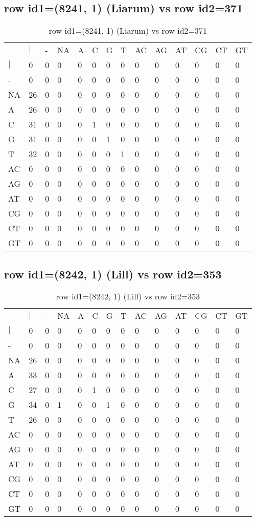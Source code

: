 \subsection{row id1=(8241, 1) (Liarum) vs row id2=371}
\begin{center}
\begin{longtable}{|l|l|l|l|l|l|l|l|l|l|l|l|l|l|}
\caption{row id1=(8241, 1) (Liarum) vs row id2=371} \label{table_dm372}\\
\hline
\\
\hline
&$|$&-&NA&A&C&G&T&AC&AG&AT&CG&CT&GT\\
$|$&0&0&0&0&0&0&0&0&0&0&0&0&0\\
-&0&0&0&0&0&0&0&0&0&0&0&0&0\\
NA&26&0&0&0&0&0&0&0&0&0&0&0&0\\
A&26&0&0&0&0&0&0&0&0&0&0&0&0\\
C&31&0&0&0&1&0&0&0&0&0&0&0&0\\
G&31&0&0&0&0&1&0&0&0&0&0&0&0\\
T&32&0&0&0&0&0&1&0&0&0&0&0&0\\
AC&0&0&0&0&0&0&0&0&0&0&0&0&0\\
AG&0&0&0&0&0&0&0&0&0&0&0&0&0\\
AT&0&0&0&0&0&0&0&0&0&0&0&0&0\\
CG&0&0&0&0&0&0&0&0&0&0&0&0&0\\
CT&0&0&0&0&0&0&0&0&0&0&0&0&0\\
GT&0&0&0&0&0&0&0&0&0&0&0&0&0\\
\hline
\end{longtable}
\end{center}

\subsection{row id1=(8242, 1) (Lill) vs row id2=353}
\begin{center}
\begin{longtable}{|l|l|l|l|l|l|l|l|l|l|l|l|l|l|}
\caption{row id1=(8242, 1) (Lill) vs row id2=353} \label{table_dm374}\\
\hline
\\
\hline
&$|$&-&NA&A&C&G&T&AC&AG&AT&CG&CT&GT\\
$|$&0&0&0&0&0&0&0&0&0&0&0&0&0\\
-&0&0&0&0&0&0&0&0&0&0&0&0&0\\
NA&26&0&0&0&0&0&0&0&0&0&0&0&0\\
A&33&0&0&0&0&0&0&0&0&0&0&0&0\\
C&27&0&0&0&1&0&0&0&0&0&0&0&0\\
G&34&0&1&0&0&1&0&0&0&0&0&0&0\\
T&26&0&0&0&0&0&0&0&0&0&0&0&0\\
AC&0&0&0&0&0&0&0&0&0&0&0&0&0\\
AG&0&0&0&0&0&0&0&0&0&0&0&0&0\\
AT&0&0&0&0&0&0&0&0&0&0&0&0&0\\
CG&0&0&0&0&0&0&0&0&0&0&0&0&0\\
CT&0&0&0&0&0&0&0&0&0&0&0&0&0\\
GT&0&0&0&0&0&0&0&0&0&0&0&0&0\\
\hline
\end{longtable}
\end{center}

